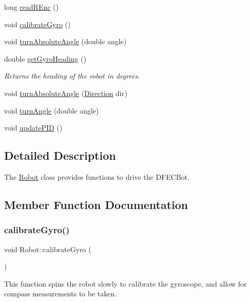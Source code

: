 \begin{DoxyCompactItemize}
long \hyperlink{classRobot_a2bc5b4f70b378e51c9bef971d24c3465}{read\+R\+Enc} ()
\item 
void \hyperlink{classRobot_a4771aee3b95bc14355c16811489340e8}{calibrate\+Gyro} ()
\item 
void \hyperlink{classRobot_aae2c42217eb706f1399d3092ca732847}{turn\+Absolute\+Angle} (double angle)
\item 
double \hyperlink{classRobot_a3352f2f6f716ebe09929ff1e14483717}{get\+Gyro\+Heading} ()
\begin{DoxyCompactList}\small\item\em Returns the heading of the robot in degrees. \end{DoxyCompactList}\item 
void \hyperlink{classRobot_aa6eba7dd97dbeff57c1ed23ba4fafad6}{turn\+Absolute\+Angle} (\hyperlink{util_8h_a92e22a126ad6bf9d255b517e70d083f6}{Direction} dir)
\item 
void \hyperlink{classRobot_a16a8fc6dbaa682231fc5f02754d3d686}{turn\+Angle} (double angle)
\item 
void \hyperlink{classRobot_a7f156346f70997f29e326d0d96acc4d0}{update\+P\+ID} ()
\end{DoxyCompactItemize}


\subsection{Detailed Description}
The \hyperlink{classRobot}{Robot} class provides functions to drive the D\+F\+E\+C\+Bot. 

\subsection{Member Function Documentation}
\mbox{\label{classRobot_a4771aee3b95bc14355c16811489340e8}} 
\subsubsection{\texorpdfstring{calibrate\+Gyro()}{calibrateGyro()}}
{\footnotesize\ttfamily void Robot\+::calibrate\+Gyro (\begin{DoxyParamCaption}{ }\end{DoxyParamCaption})\hspace{0.3cm}{\ttfamily [inline]}}

This function spins the robot slowly to calibrate the gyroscope, and allow for compass measurements to be taken. \mbox{\label{classRobot_a88211ed70c106b8b0c1c0edec49c87a4}} 
